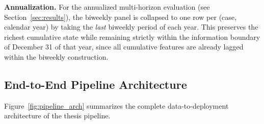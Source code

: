 \documentclass[twoside,11pt]{article}
\begin{document}
\textbf{Annualization.} For the annualized multi-horizon evaluation (see Section~\ref{sec:results}), the biweekly panel is collapsed to one row per (case, calendar year) by taking the \emph{last} biweekly period of each year. This preserves the richest cumulative state while remaining strictly within the information boundary of December 31 of that year, since all cumulative features are already lagged within the biweekly construction.



\subsection{End-to-End Pipeline Architecture}
\label{sec:pipeline_architecture}

Figure~\ref{fig:pipeline_arch} summarizes the complete data-to-deployment architecture of the thesis pipeline.
\end{document}
